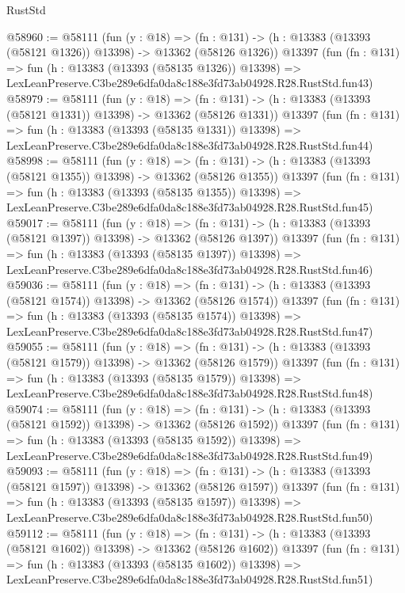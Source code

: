 \begin{lexlean}{RustStd}
\begin{coremodule}
@58960 := @58111
    (fun (y : @18) =>
    (fn : @131) -> (h : @13383 (@13393 (@58121 @1326)) @13398) -> @13362 (@58126 @1326))
    @13397
    (fun (fn : @131) =>
    fun (h : @13383 (@13393 (@58135 @1326)) @13398) =>
    LexLeanPreserve.C3be289e6dfa0da8c188e3fd73ab04928.R28.RustStd.fun43)
@58979 := @58111
    (fun (y : @18) =>
    (fn : @131) -> (h : @13383 (@13393 (@58121 @1331)) @13398) -> @13362 (@58126 @1331))
    @13397
    (fun (fn : @131) =>
    fun (h : @13383 (@13393 (@58135 @1331)) @13398) =>
    LexLeanPreserve.C3be289e6dfa0da8c188e3fd73ab04928.R28.RustStd.fun44)
@58998 := @58111
    (fun (y : @18) =>
    (fn : @131) -> (h : @13383 (@13393 (@58121 @1355)) @13398) -> @13362 (@58126 @1355))
    @13397
    (fun (fn : @131) =>
    fun (h : @13383 (@13393 (@58135 @1355)) @13398) =>
    LexLeanPreserve.C3be289e6dfa0da8c188e3fd73ab04928.R28.RustStd.fun45)
@59017 := @58111
    (fun (y : @18) =>
    (fn : @131) -> (h : @13383 (@13393 (@58121 @1397)) @13398) -> @13362 (@58126 @1397))
    @13397
    (fun (fn : @131) =>
    fun (h : @13383 (@13393 (@58135 @1397)) @13398) =>
    LexLeanPreserve.C3be289e6dfa0da8c188e3fd73ab04928.R28.RustStd.fun46)
@59036 := @58111
    (fun (y : @18) =>
    (fn : @131) -> (h : @13383 (@13393 (@58121 @1574)) @13398) -> @13362 (@58126 @1574))
    @13397
    (fun (fn : @131) =>
    fun (h : @13383 (@13393 (@58135 @1574)) @13398) =>
    LexLeanPreserve.C3be289e6dfa0da8c188e3fd73ab04928.R28.RustStd.fun47)
@59055 := @58111
    (fun (y : @18) =>
    (fn : @131) -> (h : @13383 (@13393 (@58121 @1579)) @13398) -> @13362 (@58126 @1579))
    @13397
    (fun (fn : @131) =>
    fun (h : @13383 (@13393 (@58135 @1579)) @13398) =>
    LexLeanPreserve.C3be289e6dfa0da8c188e3fd73ab04928.R28.RustStd.fun48)
@59074 := @58111
    (fun (y : @18) =>
    (fn : @131) -> (h : @13383 (@13393 (@58121 @1592)) @13398) -> @13362 (@58126 @1592))
    @13397
    (fun (fn : @131) =>
    fun (h : @13383 (@13393 (@58135 @1592)) @13398) =>
    LexLeanPreserve.C3be289e6dfa0da8c188e3fd73ab04928.R28.RustStd.fun49)
@59093 := @58111
    (fun (y : @18) =>
    (fn : @131) -> (h : @13383 (@13393 (@58121 @1597)) @13398) -> @13362 (@58126 @1597))
    @13397
    (fun (fn : @131) =>
    fun (h : @13383 (@13393 (@58135 @1597)) @13398) =>
    LexLeanPreserve.C3be289e6dfa0da8c188e3fd73ab04928.R28.RustStd.fun50)
@59112 := @58111
    (fun (y : @18) =>
    (fn : @131) -> (h : @13383 (@13393 (@58121 @1602)) @13398) -> @13362 (@58126 @1602))
    @13397
    (fun (fn : @131) =>
    fun (h : @13383 (@13393 (@58135 @1602)) @13398) =>
    LexLeanPreserve.C3be289e6dfa0da8c188e3fd73ab04928.R28.RustStd.fun51)

\end{coremodule}
\end{lexlean}
